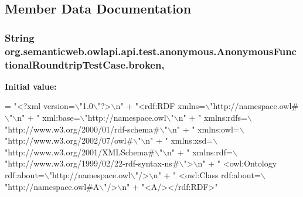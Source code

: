 \subsection{Member Data Documentation}
\hypertarget{classorg_1_1semanticweb_1_1owlapi_1_1api_1_1test_1_1anonymous_1_1_anonymous_functional_roundtrip_test_case_a8442a71085b4dc2cbc47e9485bc05a7e}{
\subsubsection[{broken}]{\setlength{\rightskip}{0pt plus 5cm}String org.\-semanticweb.\-owlapi.\-api.\-test.\-anonymous.\-Anonymous\-Functional\-Roundtrip\-Test\-Case.\-broken\hspace{0.3cm}{\ttfamily [static]}, {\ttfamily [private]}}}\label{classorg_1_1semanticweb_1_1owlapi_1_1api_1_1test_1_1anonymous_1_1_anonymous_functional_roundtrip_test_case_a8442a71085b4dc2cbc47e9485bc05a7e}
{\bfseries Initial value\-:}
\begin{DoxyCode}
= \textcolor{stringliteral}{"<?xml version=\(\backslash\)"1.0\(\backslash\)"?>\(\backslash\)n"}
            + \textcolor{stringliteral}{"<rdf:RDF xmlns=\(\backslash\)"http://namespace.owl#\(\backslash\)"\(\backslash\)n"}
            + \textcolor{stringliteral}{"     xml:base=\(\backslash\)"http://namespace.owl\(\backslash\)"\(\backslash\)n"}
            + \textcolor{stringliteral}{"     xmlns:rdfs=\(\backslash\)"http://www.w3.org/2000/01/rdf-schema#\(\backslash\)"\(\backslash\)n"}
            + \textcolor{stringliteral}{"     xmlns:owl=\(\backslash\)"http://www.w3.org/2002/07/owl#\(\backslash\)"\(\backslash\)n"}
            + \textcolor{stringliteral}{"     xmlns:xsd=\(\backslash\)"http://www.w3.org/2001/XMLSchema#\(\backslash\)"\(\backslash\)n"}
            + \textcolor{stringliteral}{"     xmlns:rdf=\(\backslash\)"http://www.w3.org/1999/02/22-rdf-syntax-ns#\(\backslash\)">\(\backslash\)n"}
            + \textcolor{stringliteral}{"    <owl:Ontology rdf:about=\(\backslash\)"http://namespace.owl\(\backslash\)"/>\(\backslash\)n"}
            + \textcolor{stringliteral}{"    <owl:Class rdf:about=\(\backslash\)"http://namespace.owl#A\(\backslash\)"/>\(\backslash\)n"}
            + \textcolor{stringliteral}{"<A/></rdf:RDF>"}
\end{DoxyCode}
